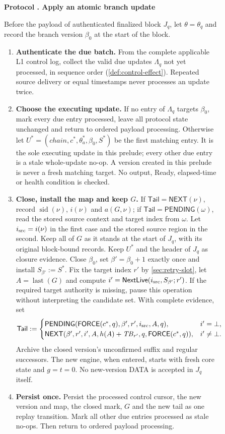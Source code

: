 \documentclass[11pt,a4paper]{article}
\newcommand{\TB}{\mathit{TB}}
\newcommand{\tagg}[1]{\ensuremath{\mathsf{#1}}}
\newcounter{protocol}
\newenvironment{protocol}[3][htbp]{\begin{figure}[#1]\refstepcounter{protocol}\label{#2}
\begin{mdframed}[linewidth=.6pt,skipabove=0pt,skipbelow=0pt,
innertopmargin=7pt,innerbottommargin=7pt]\small
\textbf{Protocol \theprotocol. #3}\par\smallskip}{\end{mdframed}\end{figure}}
\begin{document}
\begin{protocol}{alg:force}{Apply an atomic branch update}
Before the payload of authenticated finalized block $J_q$, let
$\theta=\theta_q$ and record the branch version $\beta_0$ at the start
of the block.
\begin{enumerate}[label=\textbf{\arabic*)},itemsep=3pt]
\item \textbf{Authenticate the due batch.}
From the complete applicable L1 control log, collect the valid due
updates $\Lambda_q$ not yet processed, in sequence order
(\cref{def:control-effect}). Repeated source delivery or equal timestamps
never processes an update twice.

\item \textbf{Choose the executing update.}
If no entry of $\Lambda_q$ targets $\beta_0$, mark every due entry
processed, leave all protocol state unchanged and return to ordered
payload processing. Otherwise let
$U^*=(\mathit{chain},c^*,\theta_a^*,\beta_0,S^*)$ be the first matching
entry. It is the sole executing update in this prelude; every other due
entry is a stale whole-update no-op. A version created in this prelude is
never a fresh matching target. No output, Ready, elapsed-time or health
condition is checked.

\item \textbf{Close, install the map and keep $G$.}
If $\mathsf{Tail}=\tagg{NEXT}(\nu)$, record
$\operatorname{sid}(\nu)$, $i(\nu)$ and $a(G,\nu)$; if
$\mathsf{Tail}=\tagg{PENDING}(\omega)$, read the stored source context
and target index from $\omega$.  Let $i_{\rm src}=i(\nu)$ in the first
case and the stored source region in the second. Keep all of $G$ as it
stands at the start of $J_q$, with its original block-bound records. Keep
$U^*$ and the header of $J_q$ as closure evidence. Close $\beta_0$, set
$\beta'=\beta_0+1$ exactly once and install $S_{\beta'}:=S^*$. Fix the
target index $r'$ by \cref{sec:retry-slot}, let
$A=\operatorname{last}(G)$ and compute
$i'=\tagg{NextLive}(i_{\rm src},S_{\beta'};r')$. If the required target
authority is missing, pause this operation without interpreting the
candidate set. With complete evidence, set
\[
 \mathsf{Tail}:=
 \begin{cases}
 \tagg{PENDING}(\tagg{FORCE}(c^*,q),\beta',r',i_{\rm src},A,q),
   & i'=\bot,\\
 \tagg{NEXT}(\beta',r',i',A,h(A)+\TB_{r'},q,
              \tagg{FORCE}(c^*,q)),& i'\ne\bot.
 \end{cases}
\]
Archive the closed version's unconfirmed suffix and regular successors.
The new engine, when entered, starts with fresh core state and $g=t=0$.
No new-version DATA is accepted in $J_q$ itself.

\item \textbf{Persist once.}
Persist the processed control cursor, the new version and map, the closed
mark, $G$ and the new tail as one replay transition. Mark all other due
entries processed as stale no-ops. Then return to ordered payload
processing.
\end{enumerate}
\end{protocol}
\end{document}

